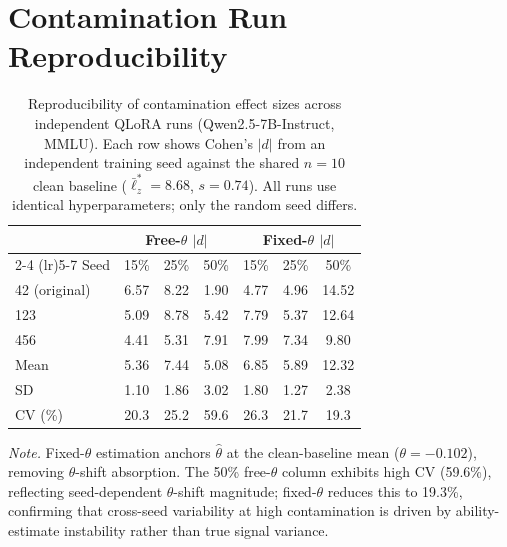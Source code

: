 \section{Contamination Run Reproducibility}\label{app:reproducibility}

\begin{table}[h]
\centering
\caption{Reproducibility of contamination effect sizes across independent QLoRA runs (Qwen2.5-7B-Instruct, MMLU). Each row shows Cohen's $|d|$ from an independent training seed against the shared $n{=}10$ clean baseline ($\bar{\ell}_z^* = 8.68$, $s = 0.74$). All runs use identical hyperparameters; only the random seed differs.}
\footnotesize
\begin{tabular}{@{}lcccccc@{}}
\toprule
& \multicolumn{3}{c}{Free-$\theta$ $|d|$} & \multicolumn{3}{c}{Fixed-$\theta$ $|d|$} \\
\cmidrule(lr){2-4} \cmidrule(lr){5-7}
Seed & 15\% & 25\% & 50\% & 15\% & 25\% & 50\% \\
\midrule
42 (original) & 6.57 & 8.22 & 1.90 & 4.77 & 4.96 & 14.52 \\
123 & 5.09 & 8.78 & 5.42 & 7.79 & 5.37 & 12.64 \\
456 & 4.41 & 5.31 & 7.91 & 7.99 & 7.34 & 9.80 \\
\addlinespace
Mean & 5.36 & 7.44 & 5.08 & 6.85 & 5.89 & 12.32 \\
SD & 1.10 & 1.86 & 3.02 & 1.80 & 1.27 & 2.38 \\
CV (\%) & 20.3 & 25.2 & 59.6 & 26.3 & 21.7 & 19.3 \\
\bottomrule
\end{tabular}
\vspace{0.5em}

\noindent\textit{Note.} Fixed-$\theta$ estimation anchors $\hat{\theta}$ at the clean-baseline mean ($\theta{=}{-}0.102$), removing $\theta$-shift absorption. The 50\% free-$\theta$ column exhibits high CV (59.6\%), reflecting seed-dependent $\theta$-shift magnitude; fixed-$\theta$ reduces this to 19.3\%, confirming that cross-seed variability at high contamination is driven by ability-estimate instability rather than true signal variance.
\end{table}

